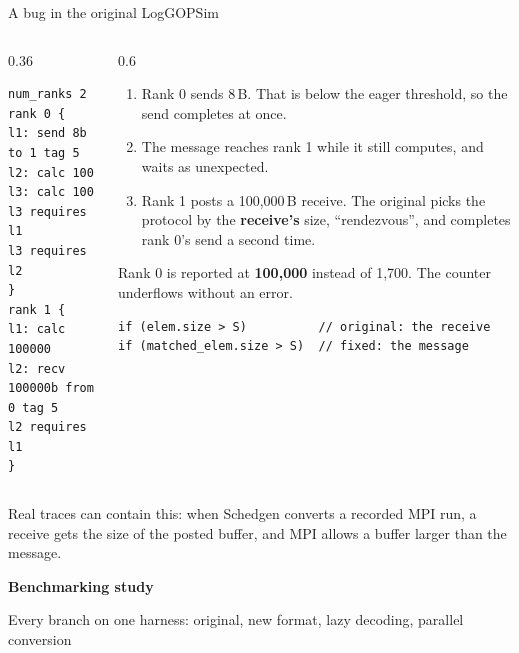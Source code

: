 \documentclass[aspectratio=169,11pt]{beamer}
\newcommand{\thento}[1]{\par\vspace{1mm}\noindent\makebox[1.4em][l]{\color{gold!85!black}$\Rightarrow$}\parbox[t]{\dimexpr\linewidth-1.4em}{\raggedright #1}\par}
\newcommand{\highlight}[1]{\colorbox{cream}{\parbox{\dimexpr\linewidth-2\fboxsep}{\small #1}}}
\begin{document}

\begin{frame}[fragile]{A bug in the original LogGOPSim}
\begin{columns}[T]
\begin{column}{0.36\textwidth}
\begin{lstlisting}
num_ranks 2
rank 0 {
l1: send 8b to 1 tag 5
l2: calc 100
l3: calc 100
l3 requires l1
l3 requires l2
}
rank 1 {
l1: calc 100000
l2: recv 100000b from 0 tag 5
l2 requires l1
}
\end{lstlisting}
\end{column}
\begin{column}{0.6\textwidth}
\small
\begin{enumerate}\setlength{\itemsep}{0pt}
\item Rank 0 sends 8\,B. That is below the eager threshold, so the send completes at once.
\item The message reaches rank 1 while it still computes, and waits as unexpected.
\item Rank 1 posts a 100,000\,B receive. The original picks the protocol by the \textbf{receive's} size, ``rendezvous'', and completes rank 0's send a second time.
\end{enumerate}
\thento{Rank 0 is reported at \textbf{100,000} instead of 1,700. The counter underflows without an error.}
\vspace{1mm}
\begin{lstlisting}
if (elem.size > S)          // original: the receive
if (matched_elem.size > S)  // fixed: the message
\end{lstlisting}
\end{column}
\end{columns}
\vfill
\highlight{Real traces can contain this: when Schedgen converts a recorded MPI run, a receive gets the size of the posted buffer, and MPI allows a buffer larger than the message.}
\end{frame}


\newcommand{\nz}[1]{\textcolor{black!40}{#1}}
\newcommand{\studysource}{Intel i9-9900K, WSL2; builds and method: \emph{How we measured}.}

\begin{frame}
\centering\vfill
{\huge\bfseries Benchmarking study\par}
\vspace{3mm}
{\color{black!60}Every branch on one harness: original, new format, lazy decoding, parallel conversion\par}
\vfill
\end{frame}
\end{document}
